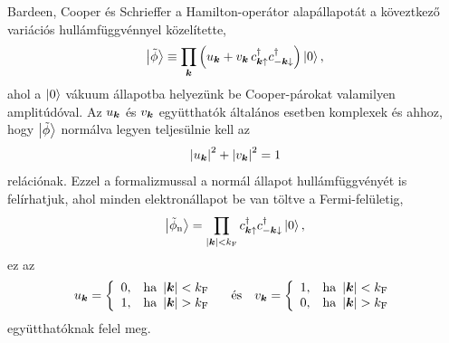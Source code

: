 \documentclass[a4paper,12pt,titlepage]{article}
\newcommand{\KK}{{\vb*{k}}}
\newcommand{\kF}{{k_\text{F}}}
\begin{document}
Bardeen, Cooper és Schrieffer a Hamilton-operátor alapállapotát a köveztkező variációs hullámfüggvénnyel közelítette,
\begin{equation} \label{phi-tilde}
	\ket{\tilde{\phi}} \equiv \prod\limits_\KK \left( u_\KK + v_\KK \, c_{\KK \uparrow}^\dagger c_{-\KK \downarrow}^\dagger \right) \ket{0},
\end{equation}
ahol a $\ket{0}$ vákuum állapotba helyezünk be Cooper-párokat valamilyen amplitúdóval.  Az $u_\KK$ és $v_\KK$ együtthatók általános esetben komplexek és ahhoz, hogy $\ket{\tilde{\phi}}$ normálva legyen teljesülnie kell az
\begin{equation} \label{u-v-norm}
	\left| u_\KK \right|^2 + \left| v_\KK \right|^2 = 1
\end{equation}
relációnak.  Ezzel a formalizmussal a normál állapot hullámfüggvényét is felírhatjuk, ahol minden elektronállapot be van töltve a Fermi-felületig,
\begin{equation}
	\ket{\tilde{\phi}_\text{n}} = \prod\limits_{\left| \KK \right| < \kF} c_{\KK \uparrow}^\dagger c_{-\KK \downarrow}^\dagger \ket{0},
\end{equation}
ez az
\begin{equation} \label{u-v-normal}
	u_\KK = \left\{ \begin{array}{ll} 0, & \text{ha } \left| \KK \right| < \kF \\ 1, & \text{ha } \left| \KK \right| > \kF \end{array} \right.
	~~~ \text{és} ~~~
	v_\KK = \left\{ \begin{array}{ll} 1, & \text{ha } \left| \KK \right| < \kF \\ 0, & \text{ha } \left| \KK \right| > \kF \end{array} \right.
\end{equation}
együtthatóknak felel meg.
\end{document}
